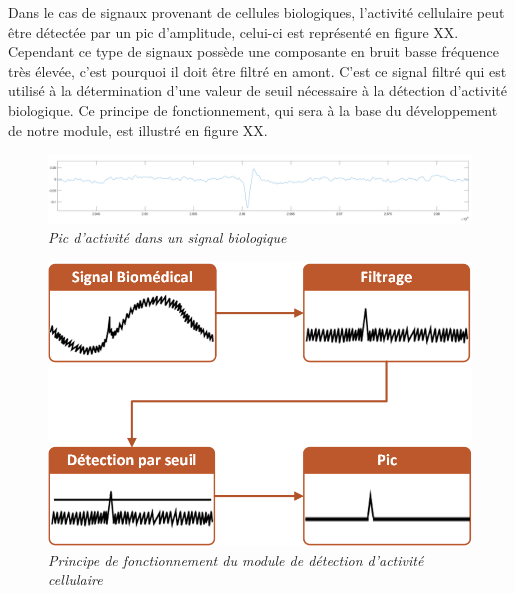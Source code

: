 \documentclass[a4paper,12pt]{article}
\begin{document}
Dans le cas de signaux provenant de cellules biologiques, l'activité cellulaire peut être détectée par un pic d'amplitude, celui-ci est représenté en figure XX. Cependant ce type de signaux possède une composante en bruit basse fréquence très élevée, c'est pourquoi il doit être filtré en amont. C'est ce signal filtré qui est utilisé à la détermination d'une valeur de seuil nécessaire à la détection d'activité biologique. Ce principe de fonctionnement, qui sera à la base du développement de notre module, est illustré en figure XX.\\

\begin{figure}[H]
\centering
\includegraphics[scale=0.18, keepaspectratio]{toto3.png}
\caption{\textit{Pic d'activité dans un signal biologique}}
\end{figure}

\begin{figure}[H]
\centering
\includegraphics[scale=0.5, keepaspectratio]{Dessin1.png}
\caption{\textit{Principe de fonctionnement du module de détection d'activité cellulaire}}
\end{figure}
\newpage
\end{document}
